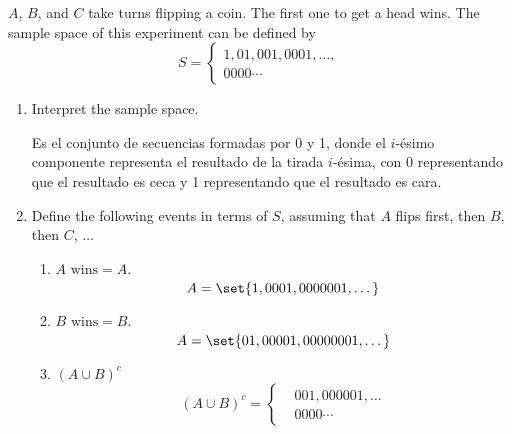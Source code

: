 \item $A$, $B$, and $C$ take turns flipping a coin. The first one to get a head wins. The sample space of this experiment can be defined by
\[ S = \begin{cases}
    1, 01, 001, 0001, \dots,\\
    0000\cdots
\end{cases} \]
\begin{enumerate}
    \item Interpret the sample space.
    
    Es el conjunto de secuencias formadas por 0 y 1, donde el $i$-ésimo componente representa el resultado de la tirada $i$-ésima, con 0 representando que el resultado es ceca y 1 representando que el resultado es cara. 
    
    \item Define the following events in terms of $S$, assuming that $A$ flips first, then $B$, then $C$, $\dots$
    \begin{enumerate}[label={\alph*.}]
        \item $A \text{ wins} = A.$
        \[ A = \set{ 1, 0001, 0000001, \dots } \]
        \item $B \text{ wins} = B.$
        \[ A = \set{ 01, 00001, 00000001, \dots } \]
        \item $(A \cup B)^c$
        \[ (A \cup B)^c = \begin{cases}
            &001, 000001, \dots\\
            &0000\cdots
        \end{cases} \]
    \end{enumerate}
\end{enumerate}